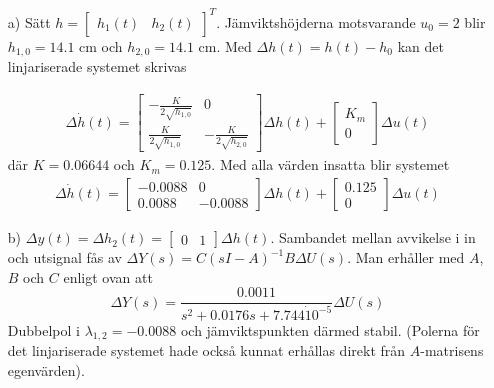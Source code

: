 \subsection{}
\begin{itemize}
\item[a)]
Sätt $h=\begin{bmatrix} h_1(t) & h_2(t) \end{bmatrix}^T$. Jämviktshöjderna motsvarande $u_0=2$ blir
$h_{1,0}=14.1$ cm  och $h_{2,0}=14.1$ cm. Med $\Delta h(t)=h(t)-h_0$
kan det linjariserade systemet skrivas

\begin{align*}
\Delta \dot{h}(t)=\begin{bmatrix} -\frac{K}{2\sqrt{h_{1,0}}}& 0\\
\frac{K}{2\sqrt{h_{1,0}}}&-\frac{K}{2\sqrt{h_{2,0}}}\end{bmatrix} \Delta h(t)+
\begin{bmatrix} K_m\\0\end{bmatrix} \Delta u(t)
\end{align*}
där $K=0.06644$ och $K_m=0.125$. Med alla värden insatta blir systemet
\begin{align*}
\Delta \dot{h}(t)=\begin{bmatrix} -0.0088& 0\\
0.0088&-0.0088\end{bmatrix} \Delta h(t)+
\begin{bmatrix} 0.125\\0\end{bmatrix} \Delta u(t)
\end{align*} 

\item[b)]
$\Delta y(t)=\Delta h_2(t)=\begin{bmatrix} 0&1\end{bmatrix}\Delta h(t)$.
Sambandet mellan avvikelse i in och utsignal fås av $\Delta
Y(s)=C(sI-A)^{-1}B \Delta U(s)$. Man erhåller med $A$, $B$ och $C$
enligt ovan att 
\begin{equation}
\Delta Y(s)=\frac{0.0011}{s^2+0.0176 s+7.744\dot10^{-5}}\Delta U(s)
\end{equation}
Dubbelpol i $\lambda_{1,2}=-0.0088$ och jämviktspunkten därmed stabil.
(Polerna för det linjariserade systemet hade också kunnat erhållas direkt från
$A$-matrisens egenvärden).

\end{itemize}

